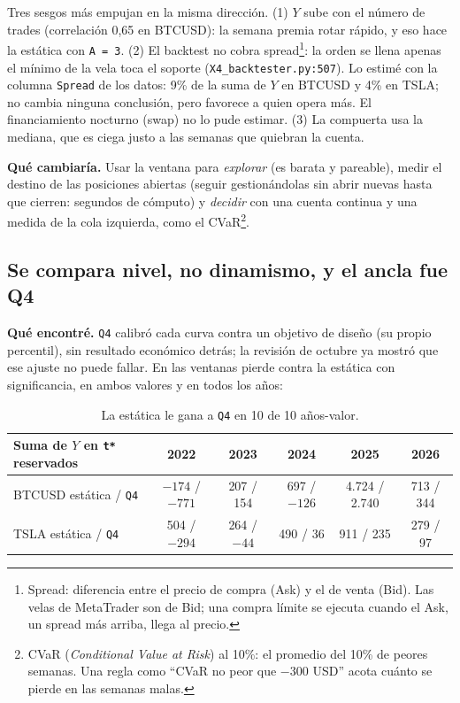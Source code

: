 \documentclass[11pt,a4paper]{article}
\newcommand{\code}[1]{\texttt{\small #1}}
\begin{document}
Tres sesgos más empujan en la misma dirección. (1) $Y$ sube con el número de trades (correlación 0,65 en
BTCUSD): la semana premia rotar rápido, y eso hace la estática con \code{A = 3}. (2) El backtest no cobra
spread\footnote{Spread: diferencia entre el precio de compra (Ask) y el de venta (Bid). Las velas de
MetaTrader son de Bid; una compra límite se ejecuta cuando el Ask, un spread más arriba, llega al precio.}:
la orden se llena apenas el mínimo de la vela toca el soporte (\code{X4\_backtester.py:507}). Lo estimé con
la columna \code{Spread} de los datos: 9\% de la suma de $Y$ en BTCUSD y 4\% en TSLA; no cambia ninguna
conclusión, pero favorece a quien opera más. El financiamiento nocturno (swap) no lo pude estimar. (3) La
compuerta usa la mediana, que es ciega justo a las semanas que quiebran la cuenta.

\textbf{Qué cambiaría.} Usar la ventana para \emph{explorar} (es barata y pareable), medir el destino de
las posiciones abiertas (seguir gestionándolas sin abrir nuevas hasta que cierren: segundos de cómputo) y
\emph{decidir} con una cuenta continua y una medida de la cola izquierda, como el CVaR\footnote{CVaR
(\emph{Conditional Value at Risk}) al 10\%: el promedio del 10\% de peores semanas. Una regla como ``CVaR
no peor que $-300$ USD'' acota cuánto se pierde en las semanas malas.}.

\subsection{Se compara nivel, no dinamismo, y el ancla fue Q4}
\label{sec:ancla}

\textbf{Qué encontré.} \code{Q4} calibró cada curva contra un objetivo de diseño (su propio percentil), sin
resultado económico detrás; la revisión de octubre ya mostró que ese ajuste no puede fallar. En las
ventanas pierde contra la estática con significancia, en ambos valores y en todos los años:

\begin{table}[h]
\centering\small
\begin{tabular}{lccccc}
\toprule
Suma de $Y$ en \code{t*} reservados & 2022 & 2023 & 2024 & 2025 & 2026 \\
\midrule
BTCUSD estática / \code{Q4} & $-174$ / $-771$ & 207 / 154 & 697 / $-126$ & 4.724 / 2.740 & 713 / 344 \\
TSLA estática / \code{Q4} & 504 / $-294$ & 264 / $-44$ & 490 / 36 & 911 / 235 & 279 / 97 \\
\bottomrule
\end{tabular}
\caption{La estática le gana a \code{Q4} en 10 de 10 años-valor.}
\end{table}
\end{document}
